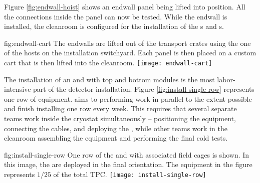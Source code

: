Figure \ref{fig:endwall-hoist} shows an endwall panel being lifted into position.
All the  connections inside the panel can now be tested. %
While the endwall is installed, the cleanroom is configured for the installation of 
the s and s. 
 
\begin{dunefigure}{fig:endwall-cart}
  {The endwalls are lifted out of the transport crates using the one of the hosts on the installation switchyard. Each panel is then placed on a custom cart that is then lifted into the cleanroom.}
\texttt{[image: endwall-cart]}
\end{dunefigure}


The installation of an  and   with top and bottom  modules is the most labor-intensive part of the detector installation. Figure \ref{fig:install-single-row} represents one row of  equipment.   aims to performing work in parallel to the extent possible and finish installing one row every week. This requires that several separate teams work inside the cryostat simultaneously --  positioning the equipment, connecting the cables, and deploying the , while other teams work in the cleanroom assembling the equipment and performing the final cold tests.  


\begin{dunefigure}{fig:install-single-row}
{One row of the  and  with associated field cages is shown. In this  image, the  are deployed in the final orientation. The equipment in the figure represents $1/25$ of the total TPC.}
 \texttt{[image: install-single-row]}
\end{dunefigure}

